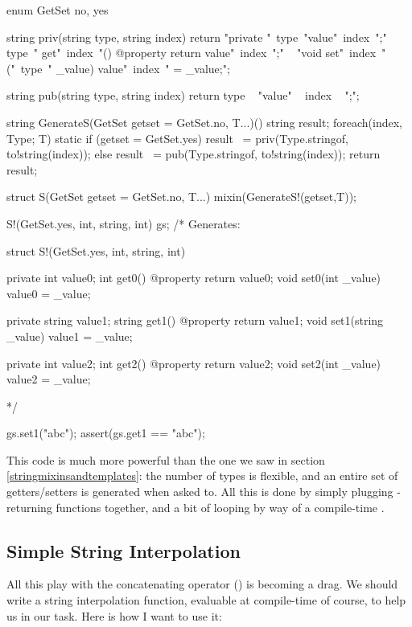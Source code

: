 \begin{dcode}
enum GetSet { no, yes}

string priv(string type, string index)
{
    return 
    "private "~type~"value"~index~";\n"
  ~ type~" get"~index~"() @property { return value"~index~";}\n"
  ~ "void set"~index~"("~type~" _value) { value"~index~" = _value;}";
}   

string pub(string type, string index)
{
    return type ~ "value" ~ index ~ ";";
}

string GenerateS(GetSet getset = GetSet.no, T...)()
{
    string result;    
    foreach(index, Type; T)
        static if (getset = GetSet.yes)
		     result ~= priv(Type.stringof, to!string(index));
        else
            result ~= pub(Type.stringof, to!string(index));
    return result;
}

struct S(GetSet getset = GetSet.no, T...)
{
    mixin(GenerateS!(getset,T));
}

S!(GetSet.yes, int, string, int) gs;
/* Generates:

struct S!(GetSet.yes, int, string, int)
{
    private int value0;
    int get0() @property { return value0;}
    void set0(int _value) { value0 = _value;}

    private string value1;
    string get1() @property { return value1;}
    void set1(string _value) { value1 = _value;}

    private int value2;
    int get2() @property { return value2;}
    void set2(int _value) { value2 = _value;}
}
*/

gs.set1("abc");
assert(gs.get1 == "abc");
\end{dcode}

This code is much more powerful than the one we saw in section \ref{stringmixinsandtemplates}: the number of types is flexible, and an entire set of getters/setters is generated when asked to. All this is done by simply plugging -returning functions together, and a bit of looping by way of a compile-time .

\subsection{Simple String Interpolation}

All this play with the concatenating operator (\DD{\~}) is becoming a drag. We should write a string interpolation function, evaluable at compile-time of course, to help us in our task. Here is how I want to use it:


